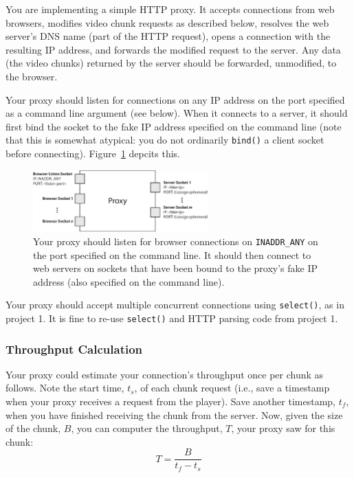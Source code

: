 \documentclass{article}
\begin{document}
You are implementing a simple HTTP proxy. It accepts connections from web
browsers, modifies video chunk requests as described below, resolves the web
server's DNS name (part of the HTTP request), opens a connection with the
resulting IP address, and forwards the modified request to the server. Any data
(the video chunks) returned by the server should be forwarded, unmodified, to
the browser.

Your proxy should listen for connections on any IP address on the port
specified as a command line argument (see below). When it connects to a server,
it should first bind the socket to the fake IP address specified on the command
line (note that this is somewhat atypical: you do not ordinarily
\texttt{bind()} a client socket before connecting). Figure~\ref{fig:proxy}
depcits this.

\begin{figure}
	\centering
	\includegraphics[width=0.6\textwidth]{figs/proxy.eps}
	\caption{Your proxy should listen for browser connections on
	\texttt{INADDR\_ANY} on the port specified on the command line. It should
	then connect to web servers on sockets that have been bound to the proxy's
	fake IP address (also specified on the command line).}

	\label{fig:proxy}
\end{figure}

Your proxy should accept multiple concurrent connections using
\texttt{select()}, as in project 1. It is fine to re-use \texttt{select()} and
HTTP parsing code from project 1.

\subsubsection{Throughput Calculation}
\label{sec:throughput-estimation}
Your proxy could estimate your connection's throughput once per chunk as
follows. Note the start time, $t_s$, of each chunk request (i.e., save a
timestamp when your proxy receives a request from the player). Save another
timestamp, $t_f$, when you have finished receiving the chunk from the server.
Now, given the size of the chunk, $B$, you can computer the throughput, $T$,
your proxy saw for this chunk:
\[
	T = \frac{B}{t_f - t_s}
\]
\end{document}
